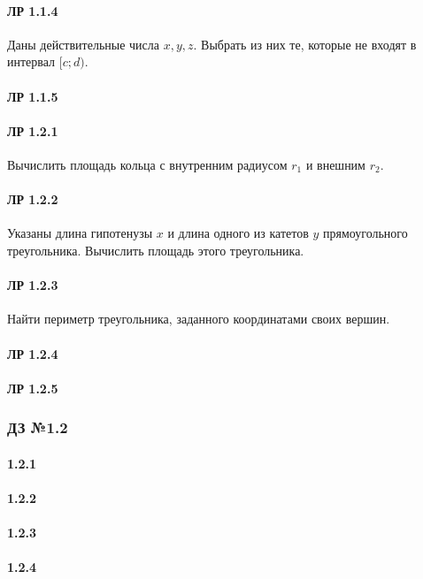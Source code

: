 \documentclass[12pt,a4paper]{report}
\begin{document}
\paragraph*{ЛР 1.1.4} Даны действительные числа $x, y, z$. Выбрать из них те, которые не входят в интервал $[c; d)$.
\paragraph*{ЛР 1.1.5} 

\paragraph*{ЛР 1.2.1} Вычислить площадь кольца с внутренним радиусом $r_1$ и внешним $r_2$.
\paragraph*{ЛР 1.2.2} Указаны длина гипотенузы $x$ и длина одного из катетов $y$ прямоугольного треугольника. Вычислить площадь этого треугольника.
\paragraph*{ЛР 1.2.3} Найти периметр треугольника, заданного координатами своих вершин.
\paragraph*{ЛР 1.2.4} 
\paragraph*{ЛР 1.2.5} 


\clearpage
\subsubsection*{ДЗ №1.2}
\paragraph*{1.2.1}
\paragraph*{1.2.2}
\paragraph*{1.2.3}
\paragraph*{1.2.4}
\end{document}
